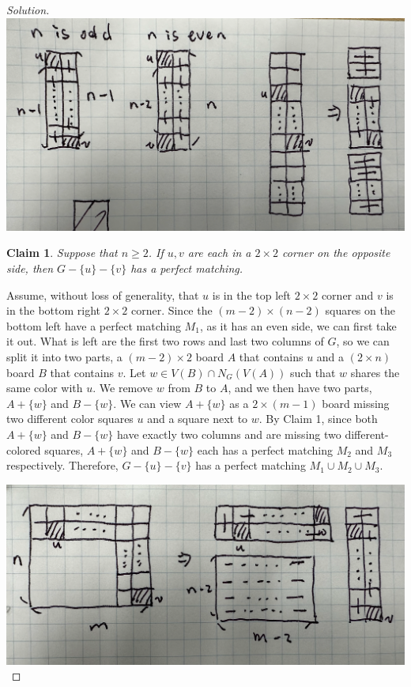 \documentclass{article}
\newtheorem{claim}[thm]{Claim}
\begin{document}
\begin{enumerate}[label=(\alph*)]
\begin{proof}[Solution]
            \includegraphics[width=\textwidth]{Q382b1}
        \begin{claim}
            Suppose that $n \geq 2$. If $u, v$ are each in a $2 \times 2$ corner on the opposite side, then $G - \{u\} - \{v\}$ has a perfect matching.
        \end{claim}
        Assume, without loss of generality, that $u$ is in the top left $2 \times 2$ corner and $v$ is in the bottom right $2 \times 2$ corner. Since the $(m - 2) \times (n - 2)$ squares on the bottom left have a perfect matching $M_1$, as it has an even side, we can first take it out. What is left are the first two rows and last two columns of $G$, so we can split it into two parts, a $(m - 2) \times 2$ board $A$ that contains $u$ and a $(2 \times n)$ board $B$ that contains $v$. Let $w \in V(B) \cap N_G(V(A))$ such that $w$ shares the same color with $u$. We remove $w$ from $B$ to $A$, and we then have two parts, $A + \{w\}$ and $B - \{w\}$. We can view $A + \{w\}$ as a $2 \times (m - 1)$ board missing two different color squares $u$ and a square next to $w$. By Claim 1, since both $A + \{w\}$ and $B - \{w\}$ have exactly two columns and are missing two different-colored squares, $A + \{w\}$ and $B - \{w\}$ each has a perfect matching $M_2$ and $M_3$ respectively. Therefore, $G - \{u\} - \{v\}$ has a perfect matching $M_1 \cup M_2 \cup M_3$.

        \includegraphics[width=\textwidth]{Q382b2}


\end{proof}
\end{enumerate}
\end{document}
